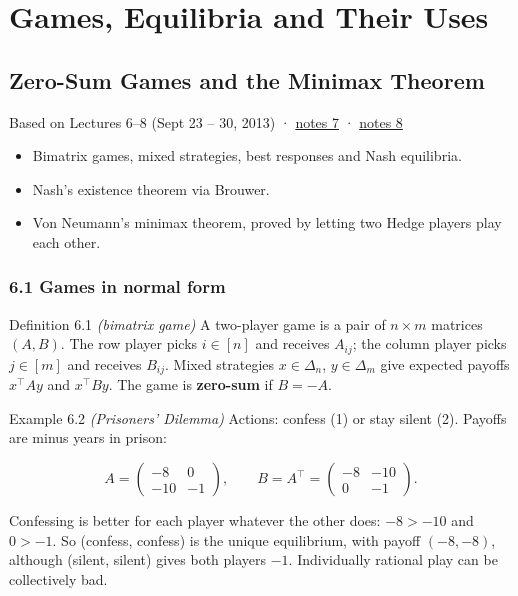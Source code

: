\documentclass[11pt,a4paper,openany]{book}
\newcommand{\simplex}{\Delta}
\newcommand{\thepartblurb}{}
\newcommand{\chapsource}[1]{{\small\sffamily\color{muted}#1\par}\medskip}
\begin{document}
\def\thepartblurb{No-regret learning proves the minimax theorem, computes equilibria, solves linear programs and boosts weak classifiers.}\part{Games, Equilibria and Their Uses}\label{part2}

\chapter[Zero-sum games and minimax]{Zero-Sum Games and the Minimax Theorem}\label{ch6}
\chapsource{Based on Lectures 6–8 (Sept 23 – 30, 2013) · \href{https://web.eecs.umich.edu/~jabernet/eecs598course/fall2013/web/notes/lec7_092513.pdf}{notes 7} · \href{https://web.eecs.umich.edu/~jabernet/eecs598course/fall2013/web/notes/lec8_093013.pdf}{notes 8}}

\begin{goals}
\begin{itemize}
\item Bimatrix games, mixed strategies, best responses and Nash equilibria.
\item Nash's existence theorem via Brouwer.
\item Von Neumann's minimax theorem, proved by letting two Hedge players play each other.
\end{itemize}
\end{goals}

\section*{6.1 Games in normal form}\label{ch6-games}

\begin{bdef}{Definition 6.1 \emph{(bimatrix game)}}
A two-player game is a pair of $n\times m$ matrices $(A,B)$. The row player picks $i\in[n]$ and receives $A_{ij}$; the column player picks $j\in[m]$ and receives $B_{ij}$. Mixed strategies $x\in\simplex_n$, $y\in\simplex_m$ give expected payoffs $x^\top Ay$ and $x^\top By$. The game is \textbf{zero-sum} if $B=-A$.
\end{bdef}

\begin{bexample}{Example 6.2 \emph{(Prisoners' Dilemma)}}
Actions: confess (1) or stay silent (2). Payoffs are minus years in prison:

\[A=\begin{pmatrix}-8&0\\-10&-1\end{pmatrix},\qquad B=A^\top=\begin{pmatrix}-8&-10\\0&-1\end{pmatrix}.\]

Confessing is better for each player whatever the other does: $-8>-10$ and $0>-1$. So (confess, confess) is the unique equilibrium, with payoff $(-8,-8)$, although (silent, silent) gives both players $-1$. Individually rational play can be collectively bad.
\end{bexample}
\end{document}
